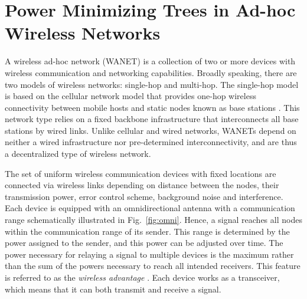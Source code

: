 \chapter{Power Minimizing Trees in Ad-hoc Wireless Networks}\label{chap:wanet}

A wireless ad-hoc network (WANET) is a collection of two or more devices with wireless communication and networking capabilities.
Broadly speaking, there are two models of wireless networks: single-hop and multi-hop.
The single-hop model is based on the cellular network model that provides one-hop wireless connectivity between mobile hosts and static nodes known as base stations \cite{clementi01}.
This network type relies on a fixed backbone infrastructure that interconnects all base stations by wired links.
Unlike cellular and wired networks, WANETs depend on neither a wired infrastructure nor pre-determined interconnectivity, and are thus a decentralized type of wireless network.

The set of uniform wireless communication devices with fixed locations are connected via wireless links depending on 
distance between the nodes, their transmission power, error control scheme, background noise and interference.
Each device is equipped with an omnidirectional antenna with a communication range schematically illustrated in Fig.~\ref{fig:omni}.
Hence, a signal reaches all nodes within the communication range of its sender.
This range is determined by the power assigned to the sender, and this power can be adjusted over time.
The power necessary for relaying a signal to multiple devices is the maximum rather than the sum of the powers necessary to reach all intended receivers.
This feature is referred to as the \emph{wireless advantage} \cite{wieselthier00}.
Each device works as a transceiver, which means that it can both transmit and receive a signal.


